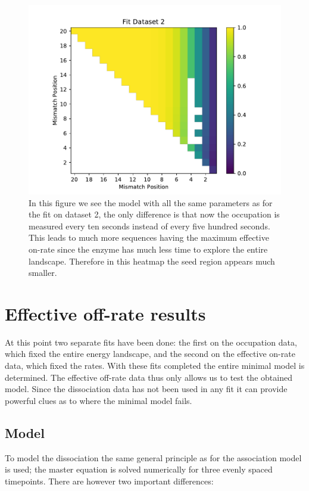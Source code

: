 \begin{figure}
\begin{center}
\includegraphics[width=\textwidth]{images/OnRateFitset2_ShrunkSeed}
\caption{In this figure we see the model with all the same parameters as for the fit on dataset 2, the only difference is that now the occupation is measured every ten seconds instead of every five hundred seconds. This leads to much more sequences having the maximum effective on-rate since the enzyme has much less time to explore the entire landscape. Therefore in this heatmap the seed region appears much smaller.}
\label{fig:OnRateHMRep1Errors}
\end{center}
\end{figure}

\section{Effective off-rate results}

At this point two separate fits have been done: the first on the occupation data, which fixed the entire energy landscape, and the second on the effective on-rate data, which fixed the rates. With these fits completed the entire minimal model is determined. The effective off-rate data thus only allows us to test the obtained model. Since the dissociation data has not been used in any fit it can provide powerful clues as to where the minimal model fails.

\subsection{Model}
To model the dissociation the same general principle as for the association model is used; the master equation is solved numerically for three evenly spaced timepoints. There are however two important differences:

